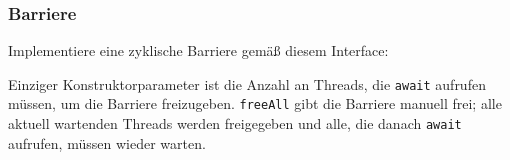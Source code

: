 \documentclass{beamer}
\begin{document}
\begin{frame}
  \frametitle{Barriere}
  Implementiere eine zyklische Barriere gemäß diesem Interface:
  
  Einziger Konstruktorparameter ist die Anzahl an Threads,
  die \lstinline{await} aufrufen müssen,
  um die Barriere freizugeben.
  \lstinline{freeAll} gibt die Barriere manuell frei;
  alle aktuell wartenden Threads werden freigegeben
  und alle, die danach \lstinline{await} aufrufen,
  müssen wieder warten.
\end{frame}
\end{document}
